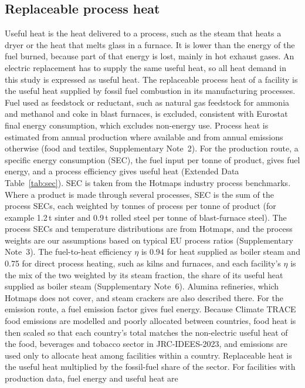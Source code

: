 \documentclass[11pt]{article}
\begin{document}
\subsection*{Replaceable process heat}
Useful heat is the heat delivered to a process, such as the steam that heats a dryer or the heat that melts glass in a furnace. It is lower than the energy of the fuel burned, because part of that energy is lost, mainly in hot exhaust gases. An electric replacement has to supply the same useful heat, so all heat demand in this study is expressed as useful heat. The replaceable process heat of a facility is the useful heat supplied by fossil fuel combustion in its manufacturing processes. Fuel used as feedstock or reductant, such as natural gas feedstock for ammonia and methanol and coke in blast furnaces, is excluded, consistent with Eurostat final energy consumption, which excludes non-energy use\cite{eurostat_fec}. Process heat is estimated from annual production where available and from annual emissions otherwise (food and textiles, Supplementary Note~2). For the production route, a specific energy consumption (SEC), the fuel input per tonne of product, gives fuel energy, and a process efficiency gives useful heat (Extended Data Table~\ref{tab:sec}). SEC is taken from the Hotmaps industry process benchmarks\cite{hotmaps2018}. Where a product is made through several processes, SEC is the sum of the process SECs, each weighted by tonnes of process per tonne of product (for example 1.2\,t sinter and 0.9\,t rolled steel per tonne of blast-furnace steel). The process SECs and temperature distributions are from Hotmaps, and the process weights are our assumptions based on typical EU process ratios (Supplementary Note~3). The fuel-to-heat efficiency $\eta$ is 0.94 for heat supplied as boiler steam and 0.75 for direct process heating, such as kilns and furnaces\cite{saad2026}, and each facility's $\eta$ is the mix of the two weighted by its steam fraction, the share of its useful heat supplied as boiler steam (Supplementary Note~6). Alumina refineries, which Hotmaps does not cover, and steam crackers are also described there. For the emission route, a fuel emission factor\cite{ipcc2006stationary} gives fuel energy. Because Climate TRACE food emissions are modelled and poorly allocated between countries, food heat is then scaled so that each country's total matches the non-electric useful heat of the food, beverages and tobacco sector in JRC-IDEES-2023\cite{jrcidees2023}, and emissions are used only to allocate heat among facilities within a country. Replaceable heat is the useful heat multiplied by the fossil-fuel share of the sector\cite{eurostat_nrg_d_indq_n}. For facilities with production data, fuel energy and useful heat are
\end{document}
